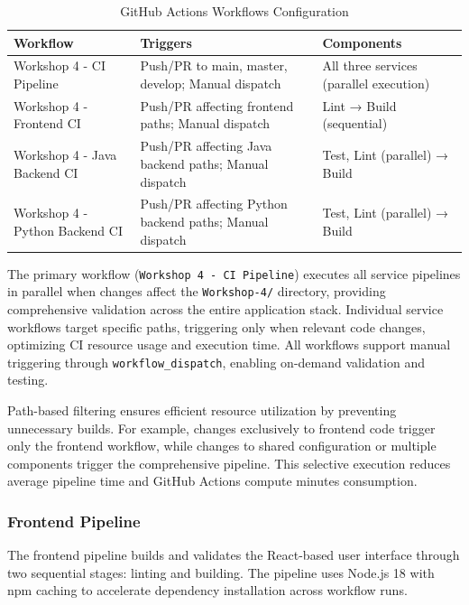 \documentclass[12pt,a4paper]{article}
\begin{document}
\begin{table}[htbp]
	\centering
	\caption{GitHub Actions Workflows Configuration}
	\label{tab:cicd_workflows}
	\small
	\begin{tabular}{@{}lp{4cm}p{4.5cm}@{}}
		\toprule
		\textbf{Workflow} & \textbf{Triggers} & \textbf{Components} \\ 
		\midrule
		Workshop 4 - CI Pipeline & Push/PR to main, master, develop; Manual dispatch & All three services (parallel execution) \\
		Workshop 4 - Frontend CI & Push/PR affecting frontend paths; Manual dispatch & Lint → Build (sequential) \\
		Workshop 4 - Java Backend CI & Push/PR affecting Java backend paths; Manual dispatch & Test, Lint (parallel) → Build \\
		Workshop 4 - Python Backend CI & Push/PR affecting Python backend paths; Manual dispatch & Test, Lint (parallel) → Build \\
		\bottomrule
	\end{tabular}
\end{table}

The primary workflow (\texttt{Workshop 4 - CI Pipeline}) executes all service pipelines in parallel when changes affect the \texttt{Workshop-4/} directory, providing comprehensive validation across the entire application stack. Individual service workflows target specific paths, triggering only when relevant code changes, optimizing CI resource usage and execution time. All workflows support manual triggering through \texttt{workflow\_dispatch}, enabling on-demand validation and testing.\newline

Path-based filtering ensures efficient resource utilization by preventing unnecessary builds. For example, changes exclusively to frontend code trigger only the frontend workflow, while changes to shared configuration or multiple components trigger the comprehensive pipeline. This selective execution reduces average pipeline time and GitHub Actions compute minutes consumption.

\subsubsection{Frontend Pipeline}

The frontend pipeline builds and validates the React-based user interface through two sequential stages: linting and building. The pipeline uses Node.js 18 with npm caching to accelerate dependency installation across workflow runs.\newline
\end{document}

